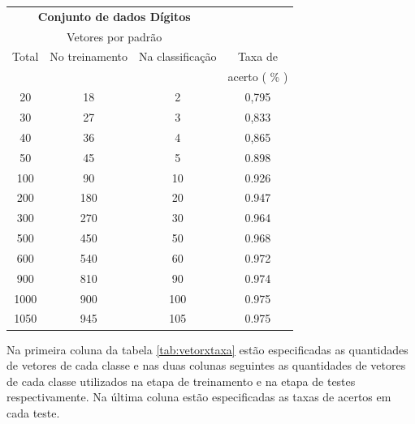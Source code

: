 \begin{center}
	 \begin{tabular}{|c|c|c|c|}
    \cline{1-3}
    \multicolumn{3}{|c|}{\textbf{Conjunto de dados Dígitos}}                     \\ \cline{1-3}
    \multicolumn{3}{|c|}{Vetores por padrão}                    \\ \hline
    Total                     & No treinamento & Na classificação & Taxa de \\ ~                         & ~              & ~                & acerto ( \% ) \\ \hline
           20   &       18                 &            2       &       0,795\\ \hline
           30   &       27                 &            3       &       0,833\\ \hline 
           40   &       36                 &            4       &       0,865\\ \hline 
    	   50   & 	45		   &		5	& 	0.898\\ \hline
   	  100   & 	90		   &	       10	&	0.926\\ \hline
	  200   &      180   		   &	       20	&	0.947\\ \hline
    	  300 	&      270		   &	       30	&	0.964\\ \hline
    	  500 	&      450  		   & 	       50	&	0.968\\ \hline
    	  600 	&      540		   &	       60	&	0.972\\ \hline
    	  900 	&      810		   &	       90	&	0.974\\ \hline
    	 1000 	&      900		   &	      100	&	0.975\\ \hline
    	 1050 	&      945		   &	      105	&	0.975\\ \hline
	\end{tabular}
	\label{tab:vetorxtaxa}
\end{center}

Na primeira coluna da tabela \ref{tab:vetorxtaxa} estão especificadas as quantidades de vetores de cada classe e nas duas colunas seguintes as quantidades de vetores de cada classe utilizados na etapa de treinamento e na etapa de testes respectivamente. Na última coluna estão especificadas as taxas de acertos em cada teste. 

